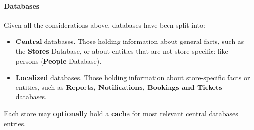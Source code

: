 \paragraph{Databases}

Given all the considerations above, databases have been split into:
\begin{itemize}
    \item \textbf{Central} databases. Those holding information about general facts, such as the \textbf{Stores} Database, or about entities that are not store-specific: like persons (\textbf{People} Database).
    \item \textbf{Localized} databases. Those holding information about store-specific facts or entities, such as \textbf{Reports, Notifications, Bookings and Tickets} databases.
\end{itemize}

Each store may \textbf{optionally} hold a \textbf{cache} for most relevant central databases entries. 

